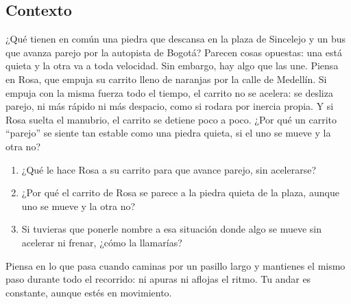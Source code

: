 \documentclass[
  spanish,
  letterpaper,
  12pt,
  oneside,
  open=any,
  DIV=15]{scrbook}
\providecommand{\tightlist}{%
  \setlength{\itemsep}{0pt}\setlength{\parskip}{0pt}}
\begin{document}
\subsection{Contexto}\label{contexto-5}

¿Qué tienen en común una piedra que descansa en la plaza de Sincelejo y
un bus que avanza parejo por la autopista de Bogotá? Parecen cosas
opuestas: una está quieta y la otra va a toda velocidad. Sin embargo,
hay algo que las une. Piensa en Rosa, que empuja su carrito lleno de
naranjas por la calle de Medellín. Si empuja con la misma fuerza todo el
tiempo, el carrito no se acelera: se desliza parejo, ni más rápido ni
más despacio, como si rodara por inercia propia. Y si Rosa suelta el
manubrio, el carrito se detiene poco a poco. ¿Por qué un carrito
``parejo'' se siente tan estable como una piedra quieta, si el uno se
mueve y la otra no?

\begin{tcolorbox}[enhanced jigsaw, arc=.35mm, bottomrule=.15mm, bottomtitle=1mm, breakable, colback=white, colbacktitle=quarto-callout-note-color!10!white, colframe=quarto-callout-note-color-frame, coltitle=black, left=2mm, leftrule=.75mm, opacityback=0, opacitybacktitle=0.6, rightrule=.15mm, title=\textcolor{quarto-callout-note-color}{\faInfo}\hspace{0.5em}{Reflexiona y Conecta (Preguntas de Comprensión)}, titlerule=0mm, toprule=.15mm, toptitle=1mm]

\begin{enumerate}
\def\labelenumi{\arabic{enumi}.}
\tightlist
\item
  ¿Qué le hace Rosa a su carrito para que avance parejo, sin acelerarse?
\item
  ¿Por qué el carrito de Rosa se parece a la piedra quieta de la plaza,
  aunque uno se mueve y la otra no?
\item
  Si tuvieras que ponerle nombre a esa situación donde algo se mueve sin
  acelerar ni frenar, ¿cómo la llamarías?
\end{enumerate}

\end{tcolorbox}

\begin{tcolorbox}[enhanced jigsaw, arc=.35mm, bottomrule=.15mm, bottomtitle=1mm, breakable, colback=white, colbacktitle=quarto-callout-tip-color!10!white, colframe=quarto-callout-tip-color-frame, coltitle=black, left=2mm, leftrule=.75mm, opacityback=0, opacitybacktitle=0.6, rightrule=.15mm, title=\textcolor{quarto-callout-tip-color}{\faLightbulb}\hspace{0.5em}{Apoyo Procedimental (Pista)}, titlerule=0mm, toprule=.15mm, toptitle=1mm]

Piensa en lo que pasa cuando caminas por un pasillo largo y mantienes el
mismo paso durante todo el recorrido: ni apuras ni aflojas el ritmo. Tu
andar es constante, aunque estés en movimiento.

\end{tcolorbox}
\end{document}

